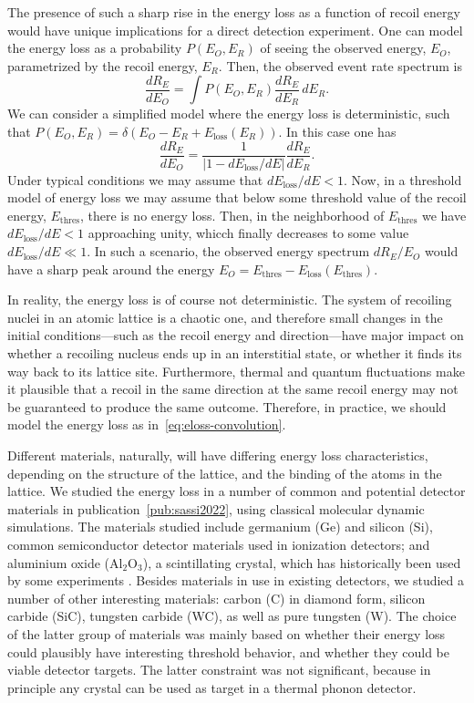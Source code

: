 \documentclass[b5paper, 10pt, twoside]{book}
\newcommand{\der}[2]{\frac{d#1}{d#2}}
\newcommand{\difd}{\,d}
\begin{document}
The presence of such a sharp rise in the energy loss as a function of recoil energy would have unique implications for a direct detection experiment. One can model the energy loss as a probability $P(E_O,E_R)$ of seeing the observed energy, $E_O$, parametrized by the recoil energy, $E_R$. Then, the observed event rate spectrum is
\begin{equation}
    \der{R_E}{E_O}=\int P(E_O,E_R)\der{R_E}{E_R}\difd E_R.
    \label{eq:eloss-convolution}
\end{equation}
We can consider a simplified model where the energy loss is deterministic, such that $P(E_O,E_R)=\delta(E_O-E_R+E_\text{loss}(E_R))$. In this case one has
\begin{equation}
    \der{R_E}{E_O}=\frac{1}{|1-dE_\text{loss}/dE|}\der{R_E}{E_R}.
\end{equation}
Under typical conditions we may assume that $dE_\text{loss}/dE<1$. Now, in a threshold model of energy loss we may assume that below some threshold value of the recoil energy, $E_\text{thres}$, there is no energy loss. Then, in the neighborhood of $E_\text{thres}$ we have $dE_\text{loss}/dE<1$ approaching unity, whicch finally decreases to some value $dE_\text{loss}/dE\ll1$. In such a scenario, the observed energy spectrum $dR_E/E_O$ would have a sharp peak around the energy $E_O=E_\text{thres}-E_\text{loss}(E_\text{thres})$.

In reality, the energy loss is of course not deterministic. The system of recoiling nuclei in an atomic lattice is a chaotic one, and therefore small changes in the initial conditions---such as the recoil energy and direction---have major impact on whether a recoiling nucleus ends up in an interstitial state, or whether it finds its way back to its lattice site. Furthermore, thermal and quantum fluctuations make it plausible that a recoil in the same direction at the same recoil energy may not be guaranteed to produce the same outcome. Therefore, in practice, we should model the energy loss as in~\eqref{eq:eloss-convolution}.

Different materials, naturally, will have differing energy loss characteristics, depending on the structure of the lattice, and the binding of the atoms in the lattice. We studied the energy loss in a number of common and potential detector materials in publication~\ref{pub:sassi2022}, using classical molecular dynamic simulations. The materials studied include germanium (Ge) and silicon (Si), common semiconductor detector materials used in ionization detectors; and aluminium oxide (Al$_2$O$_3$), a scintillating crystal, which has historically been used by some experiments \parencites{deBellefonEtAl1996, CebrianEtAl2004, AngloherEtAl2017}. Besides materials in use in existing detectors, we studied a number of other interesting materials: carbon (C) in diamond form, silicon carbide (SiC), tungsten carbide (WC), as well as pure tungsten (W). The choice of the latter group of materials was mainly based on whether their energy loss could plausibly have interesting threshold behavior, and whether they could be viable detector targets. The latter constraint was not significant, because in principle any crystal can be used as target in a thermal phonon detector.
\end{document}
